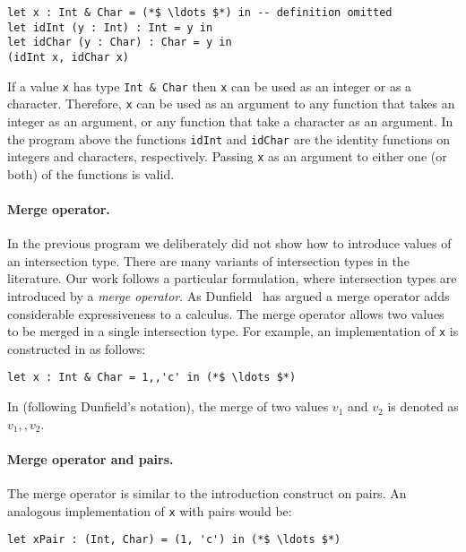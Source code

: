 \begin{lstlisting}
let x : Int & Char = (*$ \ldots $*) in -- definition omitted
let idInt (y : Int) : Int = y in
let idChar (y : Char) : Char = y in
(idInt x, idChar x)
\end{lstlisting}

\noindent If a value \lstinline{x} has type \lstinline{Int & Char} then
\lstinline{x} can be used as an integer or as a character. Therefore,
\lstinline{x} can be used as an argument to any function that takes
an integer as an argument, or any
function that take a character as an argument. In the program above
the functions \lstinline{idInt} and \lstinline{idChar} are the
identity functions on integers and characters, respectively.
Passing \lstinline{x} as an argument to either one (or both) of the
functions is valid.

\paragraph{Merge operator.}
In the previous program we deliberately did not show how to introduce values of an
intersection type. There are many variants of intersection types
in the literature. Our work follows a particular formulation, where
intersection types are introduced by a \emph{merge operator}.
As Dunfield~\cite{dunfield2014elaborating} has argued a merge operator adds considerable
expressiveness to a calculus. The merge operator allows
two values to be merged in a single intersection type. For example, an
implementation of \lstinline{x} is constructed in \namedis as follows:

\begin{lstlisting}
let x : Int & Char = 1,,'c' in (*$ \ldots $*)
\end{lstlisting}

\noindent In \namedis (following Dunfield's notation), the
merge of two values $v_1$ and $v_2$ is denoted as $v_1 ,, v_2$.

\paragraph{Merge operator and pairs.}
The merge operator is similar to the introduction construct on pairs.
An analogous implementation of \lstinline{x} with pairs would be:

\begin{lstlisting}
let xPair : (Int, Char) = (1, 'c') in (*$ \ldots $*)
\end{lstlisting}

